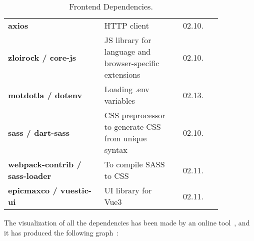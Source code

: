 \begin{table}[h!]
\begin{tabular}{ p{0.45\linewidth} p{0.35\linewidth} r p{0.05\linewidth} }
      \addlinespace[0.2cm]
      \midrule
      \addlinespace[0.2cm]
      
      \textbf{axios} & HTTP client & 02.10. \\
      
      \addlinespace[0.2cm]
      \midrule
      \addlinespace[0.2cm]
      
      \textbf{zloirock / core-js} & JS library for language and browser-specific extensions & 02.10. \\
      
      \addlinespace[0.2cm]
      \midrule
      \addlinespace[0.2cm]
      
      \textbf{motdotla / dotenv} & Loading .env variables & 02.13. \\
      
      \addlinespace[0.2cm]
      \midrule
      \addlinespace[0.2cm]
      
      \textbf{sass / dart-sass} & CSS preprocessor to generate CSS from unique syntax & 02.10. \\
      
      \addlinespace[0.2cm]
      \midrule
      \addlinespace[0.2cm]
      
      \textbf{webpack-contrib / sass-loader} & To compile SASS to CSS & 02.11. \\
      
      \addlinespace[0.2cm]
      \midrule
      \addlinespace[0.2cm]
      
      \textbf{epicmaxco / vuestic-ui} & UI library for Vue3 & 02.11. \\
      
      \bottomrule
    \end{tabular}
    
    \caption{Frontend Dependencies.}
    \label{fig:frontendDependencyTable}
\end{table}

The visualization of all the dependencies has been made by an online tool~\cite{packageLockVisualizer}, and it has produced the following graph~\cite{frontendDependencyGraph}:

